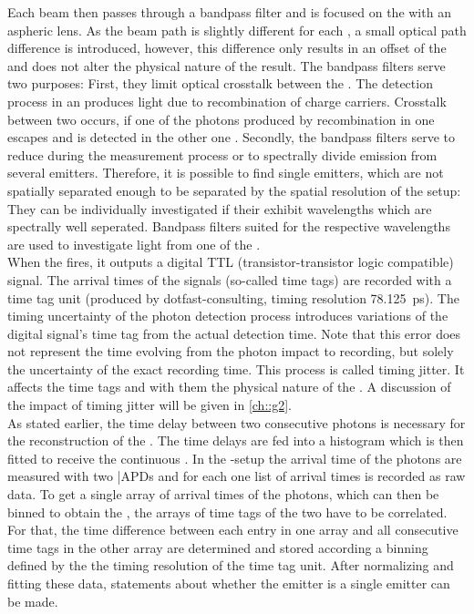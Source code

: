 		Each beam then passes through a bandpass filter and is focused on the \apd with an aspheric lens.
		As the beam path is slightly different for each \APD, a small optical path difference is introduced, however, this difference only results in an offset of the \gtf and does not alter the physical nature of the result.
		The bandpass filters serve two purposes:
		First, they limit optical crosstalk between the \apds. 
		The detection process in an \apd produces light due to recombination of charge carriers. 
		Crosstalk between two \apds occurs, if one of the photons produced by recombination in one \apd escapes and is detected in the other one \cite{Younger2009}.  
		Secondly, the bandpass filters serve to reduce \bkg during the \gt measurement process or to spectrally divide emission from several emitters.
		Therefore, it is possible to find single emitters, which are not spatially separated enough to be separated by the spatial resolution of the setup:
		They can be individually investigated if their \ZPLs exhibit wavelengths which are spectrally well seperated.
		Bandpass filters suited for the respective wavelengths are used to investigate light from one of the \ZPLs.
		\\
		When the \APD fires, it outputs a digital TTL (transistor-transistor logic compatible) signal. 
		The arrival times of the signals (so-called time tags) are recorded with a time tag unit (produced by dotfast-consulting, timing resolution \SI{78.125}{\pico\second}).
		The timing uncertainty of the photon detection process introduces variations of the digital signal's time tag from the actual detection time.
		Note that this error does not represent the time evolving from the photon impact to recording, but solely the uncertainty of the exact recording time.
		This process is called timing jitter.
		It affects the time tags and with them the physical nature of the \gtf.
		A discussion of the impact of timing jitter will be given in \autoref{ch::g2}. 
		\\
		As stated earlier, the time delay between two consecutive photons is necessary for the reconstruction of the \gtf.
		The time delays are fed into a histogram which is then fitted to receive the continuous \gtf.
		In the \HBT{}-setup the arrival time of the photons are measured with two |APDs and for each \APD one list of arrival times is recorded as raw data.
		To get a single array of arrival times of the photons, which can then be binned to obtain the \gtf, the arrays of time tags of the two \APDs have to be correlated.
		For that, the time difference between each entry in one array and all consecutive time tags in the other array are determined and stored according a binning defined by the the timing resolution of the time tag unit.
		After normalizing and fitting these data, statements about whether the emitter is a single emitter can be made.





